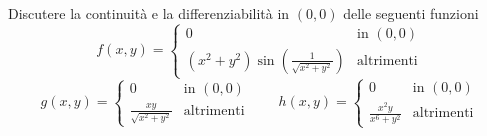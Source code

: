 \begin{es}
  Discutere la continuità e la differenziabilità in $ (0, 0) $ delle seguenti funzioni
  \begin{equation*}
    f(x, y) =
    \begin{cases}
      0 & \text{in } (0, 0) \\
      (x^2 + y^2) \sin{\left(\frac{1}{\sqrt{x^2 + y^2}}\right)} & \text{altrimenti}
    \end{cases}
  \end{equation*}
  \begin{equation*}
    g(x, y) =
    \begin{cases}
      0 & \text{in } (0, 0) \\
      \frac{xy}{\sqrt{x^2 + y^2}} & \text{altrimenti}
    \end{cases}
    \qquad
    h(x, y) = \begin{cases}
      0 & \text{in } (0, 0) \\
      \frac{x^2 y}{x^6 + y^2} & \text{altrimenti}
    \end{cases}
  \end{equation*}
\end{es}
%
